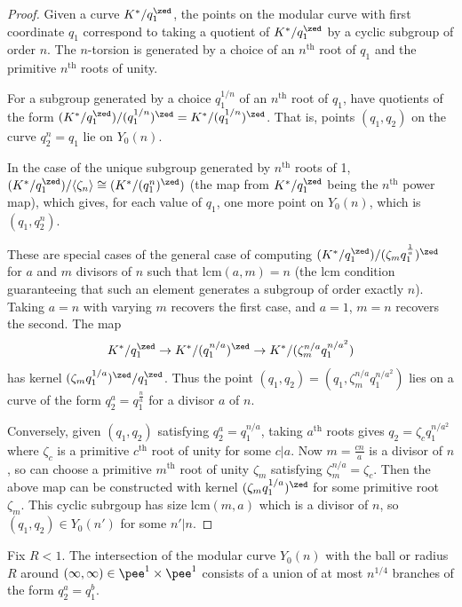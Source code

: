\documentclass[12pt,letterpaper]{article}
\begin{document}
	\begin{proof}
		Given a curve $K^*/q_1^\zed$, the points on the modular curve with first coordinate $q_1$ correspond to taking a quotient of $K^*/q_1^\zed$ by a cyclic subgroup of order $n$. The $n$-torsion is generated by a choice of an $n^\text{th}$ root of $q_1$ and the primitive $n^\text{th}$ roots of unity.
		
		For a subgroup generated by a choice $q_1^{1/n}$ of an $n^\text{th}$ root of $q_1$, have quotients of the form $(K^*/q_1^\zed)/(q_1^{1/n})^\zed = K^*/(q_1^{1/n})^\zed$. That is, points $(q_1,q_2)$ on the curve $q_2^n=q_1$ lie on $Y_0(n)$.
		
		In the case of the unique subgroup generated by $n^\text{th}$ roots of 1, $(K^*/q_1^\zed)/\langle \zeta_n\rangle\cong (K^*/(q_1^n)^\zed)$ (the map from $K^*/q_1^\zed$ being the $n^\text{th}$ power map), which gives, for each value of $q_1$, one more point on $Y_0(n)$, which is $(q_1,q_2^n)$.
		
		
		
		
		
		
		These are special cases of the general case of computing $(K^*/q_1^\zed)/ (\zeta_mq_1^\frac{1}{a})^\zed$ for $a$ and $m$ divisors of $n$ such that lcm$(a,m)=n$ (the lcm condition guaranteeing that such an element generates a subgroup of order exactly $n$). Taking $a=n$ with varying $m$ recovers the first case, and $a=1$, $m=n$ recovers the second. The map
		\[K^*/q_1^\zed\to K^*/(q_1^{n/a})^\zed\to K^*/(\zeta^{n/a}_m q_1^{n/a^2})\]
		has kernel $(\zeta_mq_1^{1/a})^\zed/q_1^\zed$. Thus the point $(q_1,q_2) = (q_1,\zeta_m^{n/a}q_1^{n/a^2})$ lies on a curve of the form $q_2^a=q_1^\frac{n}{a}$ for a divisor $a$ of $n$. 
		
		Conversely, given $(q_1,q_2)$ satisfying $q_2^a = q_1^{n/a}$, taking $a^\text{th}$ roots gives $q_2 = \zeta_c q_1^{n/a^2}$ where $\zeta_c$ is a primitive $c^\text{th}$ root of unity for some $c|a$. Now $m =\frac{cn}{a}$ is a divisor of $n$, so can choose a primitive $m^\text{th}$ root of unity $\zeta_m$ satisfying $\zeta_m^{n/a}=\zeta_c$. Then the above map can be constructed with kernel $(\zeta_mq_1^{1/a})^\zed$ for some primitive root $\zeta_m$. This cyclic subrgoup has size lcm$(m,a)$ which is a divisor of $n$, so $(q_1,q_2)\in Y_0(n')$ for some $n'|n$.		
	\end{proof}
	
	\begin{cor}\label{Tatehowmanytori}
		Fix $R<1$. The intersection of the modular curve $Y_0(n)$ with the ball or radius $R$ around $(\infty,\infty)\in \pee^1\times \pee^1$ consists of a union of at most $n^{1/4}$ branches of the form $q_2^a=q_1^b$.
	\end{cor}
	
\end{document}
